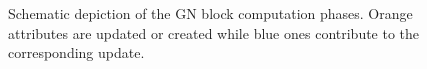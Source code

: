 \begin{figure}[H]
    \captionsetup{width=\dimexpr\textwidth-1.5cm\relax}
    \caption{Schematic depiction of the GN block computation phases. 
    \textcolor{tum-orange}{Orange} attributes are updated or created 
    while \textcolor{tum-dark-blue}{blue} ones contribute to the corresponding 
    update.}

\end{figure}